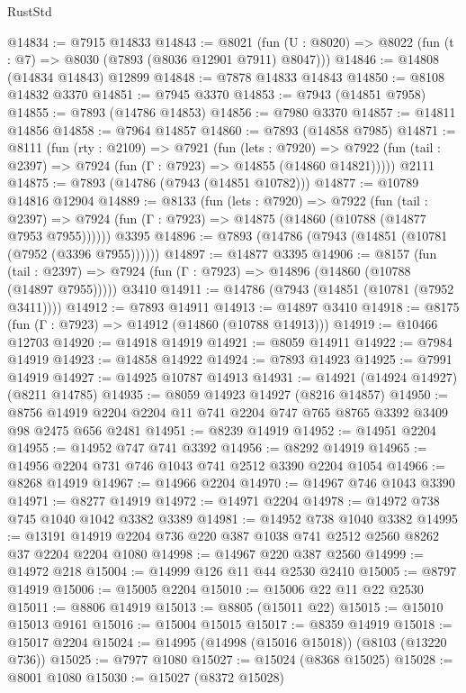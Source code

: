 \begin{lexlean}{RustStd}
\begin{coremodule}
@14834 := @7915 @14833
@14843 := @8021
    (fun (U : @8020) => @8022 (fun (t : @7) => @8030 (@7893 (@8036 @12901 @7911) @8047)))
@14846 := @14808 (@14834 @14843) @12899
@14848 := @7878 @14833 @14843
@14850 := @8108 @14832 @3370
@14851 := @7945 @3370
@14853 := @7943 (@14851 @7958)
@14855 := @7893 (@14786 @14853)
@14856 := @7980 @3370
@14857 := @14811 @14856
@14858 := @7964 @14857
@14860 := @7893 (@14858 @7985)
@14871 := @8111
    (fun (rty : @2109) =>
    @7921
      (fun (lets : @7920) =>
      @7922 (fun (tail : @2397) => @7924 (fun (Γ : @7923) => @14855 (@14860 @14821)))))
    @2111
@14875 := @7893 (@14786 (@7943 (@14851 @10782)))
@14877 := @10789 @14816 @12904
@14889 := @8133
    (fun (lets : @7920) =>
    @7922
      (fun (tail : @2397) =>
      @7924 (fun (Γ : @7923) => @14875 (@14860 (@10788 (@14877 @7953 @7955))))))
    @3395
@14896 := @7893 (@14786 (@7943 (@14851 (@10781 (@7952 (@3396 @7955))))))
@14897 := @14877 @3395
@14906 := @8157
    (fun (tail : @2397) => @7924 (fun (Γ : @7923) => @14896 (@14860 (@10788 (@14897 @7955)))))
    @3410
@14911 := @14786 (@7943 (@14851 (@10781 (@7952 @3411))))
@14912 := @7893 @14911
@14913 := @14897 @3410
@14918 := @8175 (fun (Γ : @7923) => @14912 (@14860 (@10788 @14913)))
@14919 := @10466 @12703
@14920 := @14918 @14919
@14921 := @8059 @14911
@14922 := @7984 @14919
@14923 := @14858 @14922
@14924 := @7893 @14923
@14925 := @7991 @14919
@14927 := @14925 @10787 @14913
@14931 := @14921 (@14924 @14927) (@8211 @14785)
@14935 := @8059 @14923 @14927 (@8216 @14857)
@14950 := @8756 @14919 @2204 @2204 @11 @741 @2204 @747 @765 @8765 @3392 @3409 @98 @2475 @656 @2481
@14951 := @8239 @14919
@14952 := @14951 @2204
@14955 := @14952 @747 @741 @3392
@14956 := @8292 @14919
@14965 := @14956 @2204 @731 @746 @1043 @741 @2512 @3390 @2204 @1054
@14966 := @8268 @14919
@14967 := @14966 @2204
@14970 := @14967 @746 @1043 @3390
@14971 := @8277 @14919
@14972 := @14971 @2204
@14978 := @14972 @738 @745 @1040 @1042 @3382 @3389
@14981 := @14952 @738 @1040 @3382
@14995 := @13191 @14919 @2204 @736 @220 @387 @1038 @741 @2512 @2560 @8262 @37 @2204 @2204 @1080
@14998 := @14967 @220 @387 @2560
@14999 := @14972 @218
@15004 := @14999 @126 @11 @44 @2530 @2410
@15005 := @8797 @14919
@15006 := @15005 @2204
@15010 := @15006 @22 @11 @22 @2530
@15011 := @8806 @14919
@15013 := @8805 (@15011 @22)
@15015 := @15010 @15013 @9161
@15016 := @15004 @15015
@15017 := @8359 @14919
@15018 := @15017 @2204
@15024 := @14995 (@14998 (@15016 @15018)) (@8103 (@13220 @736))
@15025 := @7977 @1080
@15027 := @15024 (@8368 @15025)
@15028 := @8001 @1080
@15030 := @15027 (@8372 @15028)

\end{coremodule}
\end{lexlean}
